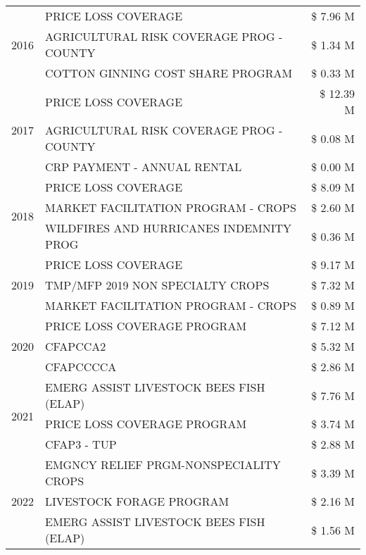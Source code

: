 \begin{tabular}{llr}
\multirow[t]{3}{*}{2016} & PRICE LOSS COVERAGE & \$ 7.96 M \\
 & AGRICULTURAL RISK COVERAGE PROG - COUNTY & \$ 1.34 M \\
 & COTTON GINNING COST SHARE PROGRAM & \$ 0.33 M \\
\cline{1-3}
\multirow[t]{3}{*}{2017} & PRICE LOSS COVERAGE & \$ 12.39 M \\
 & AGRICULTURAL RISK COVERAGE PROG - COUNTY & \$ 0.08 M \\
 & CRP PAYMENT - ANNUAL RENTAL & \$ 0.00 M \\
\cline{1-3}
\multirow[t]{3}{*}{2018} & PRICE LOSS COVERAGE & \$ 8.09 M \\
 & MARKET FACILITATION PROGRAM - CROPS & \$ 2.60 M \\
 & WILDFIRES AND HURRICANES INDEMNITY PROG & \$ 0.36 M \\
\cline{1-3}
\multirow[t]{3}{*}{2019} & PRICE LOSS COVERAGE & \$ 9.17 M \\
 & TMP/MFP 2019 NON SPECIALTY CROPS & \$ 7.32 M \\
 & MARKET FACILITATION PROGRAM - CROPS & \$ 0.89 M \\
\cline{1-3}
\multirow[t]{3}{*}{2020} & PRICE LOSS COVERAGE PROGRAM & \$ 7.12 M \\
 & CFAPCCA2 & \$ 5.32 M \\
 & CFAPCCCCA & \$ 2.86 M \\
\cline{1-3}
\multirow[t]{3}{*}{2021} & EMERG ASSIST LIVESTOCK BEES FISH (ELAP) & \$ 7.76 M \\
 & PRICE LOSS COVERAGE PROGRAM & \$ 3.74 M \\
 & CFAP3 - TUP & \$ 2.88 M \\
\cline{1-3}
\multirow[t]{3}{*}{2022} & EMGNCY RELIEF PRGM-NONSPECIALITY CROPS & \$ 3.39 M \\
 & LIVESTOCK FORAGE PROGRAM & \$ 2.16 M \\
 & EMERG ASSIST LIVESTOCK BEES FISH (ELAP) & \$ 1.56 M \\
\cline{1-3}
\bottomrule
\end{tabular}

